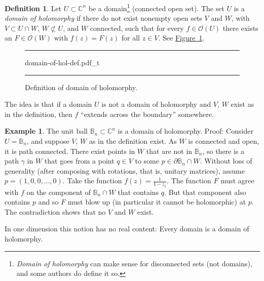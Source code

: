 \documentclass[12pt,openany]{book}
\newcommand{\C}{{\mathbb{C}}}
\newcommand{\bB}{{\mathbb{B}}}
\newcommand{\sO}{{\mathscr{O}}}
\newcommand{\myindex}[1]{#1\index{#1}}
\theoremstyle{plain}
\theoremstyle{remark}
\theoremstyle{definition}
\newtheorem{defn}[thm]{Definition}
\newenvironment{myfig}{%
\begin{figure}[h!t]
\noindent\rule{\textwidth}{0.5pt}\vspace{12pt}\par\centering}%
{\par\noindent\rule{\textwidth}{0.5pt}
\end{figure}}
\theoremstyle{exercise}
\theoremstyle{example}
\newtheorem{example}[thm]{Example}
\newcommand{\figureref}[1]{\hyperref[#1]{Figure~\ref*{#1}}}
\begin{document}
\begin{defn} \label{defn:domainofhol}
Let $U \subset \C^n$ be a domain\footnote{\emph{Domain of
holomorphy} can make sense for disconnected sets (not domains), and some authors
do define it so.}
(connected open set).  The set $U$ is
a \emph{\myindex{domain of holomorphy}} if there do not exist
nonempty open sets
$V$ and $W$, with $V \subset U \cap W$, $W \not\subset U$, and $W$
connected, such that for every $f \in \sO(U)$ there exists an $F \in
\sO(W)$ with $f(z) = F(z)$ for all $z \in V$.  See
\figureref{fig:domain-of-hol-def}.
\end{defn}

\begin{myfig}
{domain-of-hol-def.pdf_t}
\caption{Definition of domain of holomorphy.\label{fig:domain-of-hol-def}}
\end{myfig}

The idea is that if a domain $U$
is not a domain of holomorphy and $V$, $W$ exist as in the
definition, then $f$ ``extends across the boundary'' somewhere.

\begin{example}
The unit ball $\bB_n \subset \C^n$ is a domain of holomorphy.  Proof: 
Consider $U=\bB_n$, and suppose $V$, $W$ as in the definition exist.
As $W$ is
connected and open, it is path connected.  There exist
points in $W$ that are not in $\bB_n$, so there
is a path $\gamma$ in $W$ that goes
from a point $q \in V$ to some $p \in \partial \bB_n \cap W$.
Without loss of generality (after composing with
rotations, that is, unitary matrices), assume $p =
(1,0,0,\ldots,0)$.  Take the function $f(z) = \frac{1}{1-z_1}$.  
The function $F$ must agree with $f$ on the component of
$\bB_n \cap W$ that contains $q$.  But that component also contains $p$ and
so $F$ must blow up (in particular it cannot be holomorphic) at
$p$.  The contradiction shows that no $V$ and $W$ exist.
\end{example}

In one dimension this notion has no real content: Every domain is a domain
of holomorphy.
\end{document}

